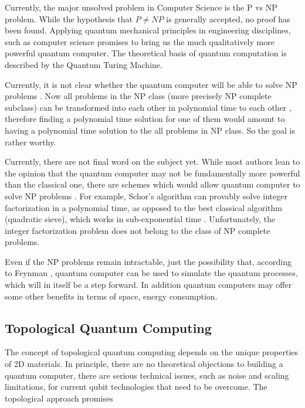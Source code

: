 Currently, the major unsolved problem in Computer Science is the P vs NP problem\cite{PvsNP}. While the hypothesis that $ P \neq NP $ is generally accepted, no proof has been found. Applying quantum mechanical principles in engineering disciplines, such as computer science\cite{FQC} promises to bring us the much qualitatively more powerful quantum computer. The theoretical basis of quantum computation is described by the Quantum Turing Machine\cite{QuantumTuring}. 

Currently, it is not clear whether the quantum computer will be able to solve NP problems\cite{QCvsNP} . Now all problems in the NP class (more precisely NP complete subclass) can be transformed into each other in polynomial time to each other \cite{NPComplete},  therefore finding a polynomial time solution for one of them would amount to having a polynomial time solution to the all problems in NP class. So the goal is rather worthy.

Currently, there are not final word on the subject yet. While most authors lean to the opinion that the quantum computer may not be fundamentally more powerful than the classical one, there are schemes \cite{NLQC} which would allow quantum computer to solve NP problems . For example,  Schor's algorithm \cite{Schor} can provably solve integer factorization in a polynomial time, as opposed to the best classical algorithm (quadratic sieve), which works in sub-exponential time \cite{Pomerance}. Unfortunately, the integer factorization problem does not belong to the class of NP complete problems. 

Even if the NP problems remain intractable, just the possibility that, according to Feynman \cite{FQC}, quantum computer can be used to simulate the quantum processes, which will in itself be a step forward. In addition quantum computers may offer some other benefits in terms of space, energy consumption. 

\subsection*{Topological Quantum Computing}
The concept of topological quantum computing \cite{Tqc1}
depends on the unique properties of 2D materials.  In principle, there are no theoretical objections to building a quantum computer, there are serious technical issues, such as noise
and scaling limitations, for current qubit technologies
that need to be overcome\cite{QCProblems}. 
The topological approach promises 

